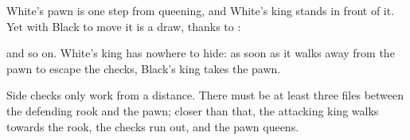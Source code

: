 

White's pawn is one step from queening, and White's king stands in front of it. Yet with Black
to move it is a draw, thanks to
:


and so on. White's king has nowhere to hide: as soon as it walks away from the pawn to escape
the checks, Black's king takes the pawn.

Side checks only work from a distance. There must be at least three files between the
defending rook and the pawn; closer than that, the attacking king walks towards the rook,
the checks run out, and the pawn queens.
